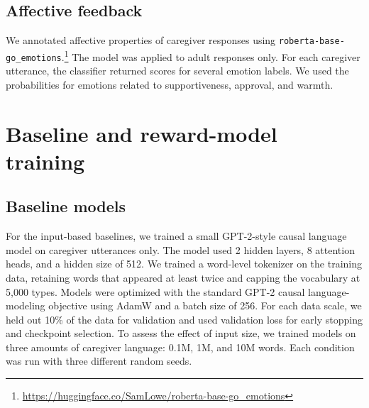 \subsection*{Affective feedback}

We annotated affective properties of caregiver responses using \texttt{roberta-base-go\_emotions}.\footnote{\url{https://huggingface.co/SamLowe/roberta-base-go_emotions}} The model was applied to adult responses only. For each caregiver utterance, the classifier returned scores for several emotion labels. We used the probabilities for emotions related to supportiveness, approval, and warmth.






\section{Baseline and reward-model training}
\label{sec:rlhf_training}

\subsection*{Baseline models}
For the input-based baselines, we trained a small GPT-2-style causal language model on caregiver utterances only. The model used 2 hidden layers, 8 attention heads, and a hidden size of 512. We trained a word-level tokenizer on the training data, retaining words that appeared at least twice and capping the vocabulary at 5,000 types. Models were optimized with the standard GPT-2 causal language-modeling objective using AdamW and a batch size of 256. For each data scale, we held out 10\% of the data for validation and used validation loss for early stopping and checkpoint selection. To assess the effect of input size, we trained models on three amounts of caregiver language: 0.1M, 1M, and 10M words. Each condition was run with three different random seeds.

